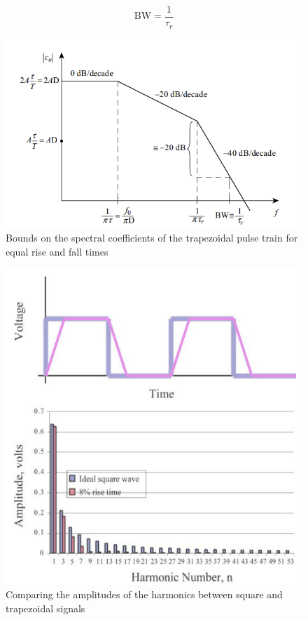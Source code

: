 \documentclass[final]{cubedoc}
\begin{document}
	\[\text{BW} = \frac{1}{τ_r}\]
	
	\begin{figure}[h!]
		\centering
		\includegraphics[keepaspectratio, width = \textwidth, height=.35\textheight]{assets/magnitude_clock.png}
		\caption{Bounds on the spectral coefficients of the trapezoidal pulse train for equal rise and fall times \cite[p.16]{paul2011transmission}}
	\end{figure}
	
	\begin{figure}[h!]
		\centering
		\includegraphics[keepaspectratio, height = .4\textheight, width = \textwidth]{assets/square_n_trapezoidal.png}
		\caption{Comparing the amplitudes of the harmonics between square and trapezoidal signals \cite{bogatin2009signal}}
	\end{figure}
	
\end{document}
